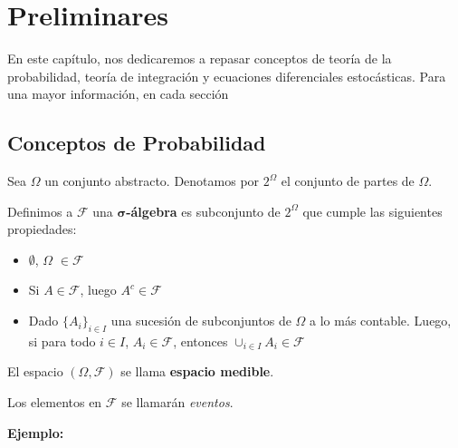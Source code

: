 
\chapter{Preliminares}


En este capítulo, nos dedicaremos a repasar conceptos de teoría de la probabilidad, teoría de integración y ecuaciones diferenciales estocásticas. Para una mayor información, en cada sección






\section{Conceptos de Probabilidad}

Sea $\Omega$ un conjunto abstracto. Denotamos por $2^{\Omega}$ el conjunto de partes de $\Omega$.

\begin{boxDef}
Definimos a $\mathcal{F}$ una $\mathbf{\sigma}$\textbf{-álgebra} es subconjunto de $2^{\Omega}$ que cumple las siguientes propiedades:

	\begin{itemize}
		\item $\emptyset$, $\Omega$ $\in \mathcal{F}$
		\item Si $A \in \mathcal{F}$, luego $A^{c} \in \mathcal{F}$
		\item Dado $\{ A_i \}_{i \in I}$ una sucesión de subconjuntos de $\Omega$ a lo más contable. Luego, si para todo $i \in I$, $A_i \in \mathcal{F}$, entonces $\cup_{i \in I} A_i \in \mathcal{F}$ 
	\end{itemize}

El espacio $\left( \Omega, \mathcal{F} \right)$ se llama \textbf{espacio medible}.

\end{boxDef}



Los elementos en $\mathcal{F}$ se llamarán \textit{eventos}.



\textbf{Ejemplo:}

